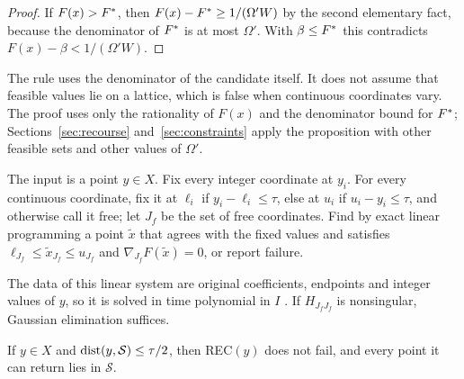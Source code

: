 \begin{proof}
If $F(x)>F^{*}$, then $F(x)-F^{*}\ge1/(\Omega'W)$ by the second elementary
fact, because the denominator of $F^{*}$ is at most $\Omega'$. With
$\beta\le F^{*}$ this contradicts $F(x)-\beta<1/(\Omega'W)$.
\end{proof}

The rule uses the denominator of the candidate itself. It does not assume
that feasible values lie on a lattice, which is false when continuous
coordinates vary. The proof uses only the rationality of $F(x)$ and the
denominator bound for $F^{*}$; Sections~\ref{sec:recourse}
and~\ref{sec:constraints} apply the proposition with other feasible sets and
other values of $\Omega'$.

\begin{algorithm}\label{alg:rec}
The input is a point $y\in X$. Fix every integer coordinate at $y_i$. For
every continuous coordinate, fix it at $\ell_i$ if $y_i-\ell_i\le\tau$, else
at $u_i$ if $u_i-y_i\le\tau$, and otherwise call it free; let $J_f$ be the set
of free coordinates. Find by exact linear programming a point $\tilde x$ that
agrees with the fixed values and satisfies $\ell_{J_f}\le\tilde x_{J_f}\le u_{J_f}$ and
$\nabla_{J_f}F(\tilde x)=0$, or report failure.
\end{algorithm}

The data of this linear system are original coefficients, endpoints and
integer values of $y$, so it is solved in time polynomial in $I$
\cite[Theorem~6.4.12]{GrotschelLovaszSchrijver1988}. If $H_{J_fJ_f}$ is
nonsingular, Gaussian elimination suffices.

\begin{lemma}\label{lem:snap}
If $y\in X$ and $\operatorname{dist}(y,\mathcal S)\le\tau/2$, then REC$(y)$ does not fail,
and every point it can return lies in $\mathcal S$.
\end{lemma}


